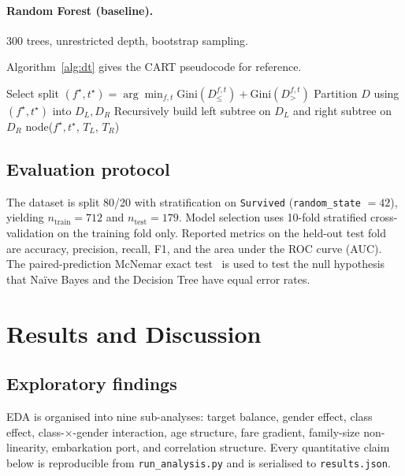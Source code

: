 \documentclass[10pt,a4paper,twocolumn]{article}
\begin{document}
\paragraph{Random Forest (baseline).} $300$ trees, unrestricted depth, bootstrap
sampling.

Algorithm~\ref{alg:dt} gives the CART pseudocode for reference.

\begin{algorithm}[tb]
\small
\SetAlgoLined
{}
Select split $(f^\star,t^\star) = \arg\min_{f,t} \mathrm{Gini}(D^{f,t}_{\le}) + \mathrm{Gini}(D^{f,t}_{>})$\;
Partition $D$ using $(f^\star,t^\star)$ into $D_L, D_R$\;
Recursively build left subtree on $D_L$ and right subtree on $D_R$\;
\Return node($f^\star,t^\star$, $T_L$, $T_R$)\;
\caption{CART induction with Gini impurity.}
\label{alg:dt}
\end{algorithm}

\subsection{Evaluation protocol}
The dataset is split 80/20 with stratification on \texttt{Survived} (\texttt{random\_state}
$=42$), yielding $n_\text{train}=712$ and $n_\text{test}=179$. Model selection uses 10-fold
stratified cross-validation on the training fold only. Reported metrics on the held-out
test fold are accuracy, precision, recall, F1, and the area under the ROC curve (AUC).
The paired-prediction McNemar exact test~\cite{han2011data} is used to test the null
hypothesis that Na\"ive Bayes and the Decision Tree have equal error rates.

\section{Results and Discussion}\label{sec:results}

\subsection{Exploratory findings}\label{sec:eda}
EDA is organised into nine sub-analyses: target balance, gender effect, class effect,
class-$\times$-gender interaction, age structure, fare gradient, family-size
non-linearity, embarkation port, and correlation structure. Every quantitative claim
below is reproducible from \texttt{run\_analysis.py} and is serialised to
\texttt{results.json}.
\end{document}
